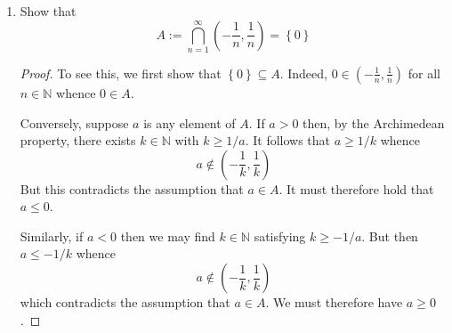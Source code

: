 \documentclass[12pt, reqno]{article}
\numberwithin{equation}{section}
\theoremstyle{definition}
\theoremstyle{remark}
\newcommand{\NN}{\mathbb{N}}
\newcommand{\RR}{\mathbb{R}}
\newcommand{\set}[1]{\left\{#1\right\}}
\renewcommand{\epsilon}{\varepsilon}
\begin{document}
\begin{enumerate}[leftmargin=*]
\begin{proof}[Solution]
		      \hspace{0.5cm}  (c) The natural numbers are closed. Indeed, we have
		      \[
			      \RR\setminus\NN = (-\infty, 1) \bigcup_{n=1}^\infty (n, n+1)
		      \]
		      which is open since the union of open sets is open.

		      \hspace{0.5cm}  (d) For any $x\in \RR$, we have that
		      \[
			      \RR\setminus\set{x} = (-\infty, x)\cup (x, \infty)
		      \]
		      is open. It follows that $\set{x}$ is closed.

		      \hspace{0.5cm} (e) Any finite set is closed. Indeed, a finite set is a finite union of singletons. As shown in (d), singletons are closed. It follows that finite sets are the finite union of closed sets and therefore closed.

		      \hspace{0.5cm}  (f) The set $(0,1)\cup [2,3]$ is neither open nor closed. Here, we only show that it is not open.

		      Suppose for a contradiction that $(0,1)\cup [2,3]$ is open. Then there exists $\epsilon>0$ such that $V_\epsilon(3) \subseteq (0,1)\cup [2,3]$. But $V_\epsilon(3)$ contains the point $3+\epsilon/2$ which is not in $(0,1)\cup [2,3]$.

	      \end{proof}


	\item Show that
	      \[
		      A:= \bigcap_{n=1}^\infty \left(-\frac{1}{n}, \frac{1}{n}\right) = \set{0}
	      \]

	      \begin{proof}
		      To see this, we first show that $\set{0}\subseteq A$. Indeed, $0\in (-\frac{1}{n}, \frac{1}{n})$ for all $n\in \NN$ whence $0\in A$.

		      Conversely, suppose $a$ is any element of $A$. If $a>0$ then, by the Archimedean property, there exists $k\in \NN$ with $k \geq 1/a$. It follows that $a \geq 1/k$ whence
		      \[
			      a\not\in \left(-\frac{1}{k}, \frac{1}{k}\right)
		      \]
		      But this contradicts the assumption that $a\in A$. It must therefore hold that $a \leq  0$.

		      Similarly, if $a<0$ then we may find $k\in \NN$ satisfying $k \geq -1/a$. But then $a \leq -1/k$ whence
		      \[
			      a\not\in \left(-\frac{1}{k}, \frac{1}{k}\right)
		      \]
		      which contradicts the assumption that $a\in A$. We must therefore have $a\geq 0$.


\end{proof}
\end{enumerate}
\end{document}
